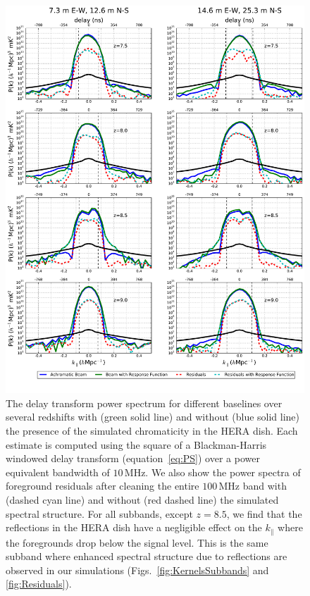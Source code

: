 \documentclass[twocolumn]{emulateapj}
\begin{document}
\begin{figure}
\includegraphics[width=\textwidth]{figures/ps_compare_nithya_bothBaselines.pdf}
\vspace{-24pt}
\caption{The delay transform power spectrum for different baselines over several redshifts with (green solid line) and without (blue solid line) the presence of the simulated chromaticity in the HERA dish. Each estimate is computed using the square of a Blackman-Harris windowed  delay transform (equation~\ref{eq:PS}) over a power equivalent bandwidth of $10$\,MHz. We also show the power spectra of foreground residuals after cleaning the entire $100$\,MHz band with (dashed cyan line) and without (red dashed line) the simulated spectral structure. For all subbands, except $z=8.5$, we find that the reflections in the HERA dish have a negligible effect on the $k_\parallel$ where the foregrounds drop below the signal level. This is the same subband where enhanced spectral structure due to reflections are observed in our simulations (Figs.~\ref{fig:KernelsSubbands} and \ref{fig:Residuals}).}
\label{fig:BothBaselines}
\end{figure}
\end{document}
